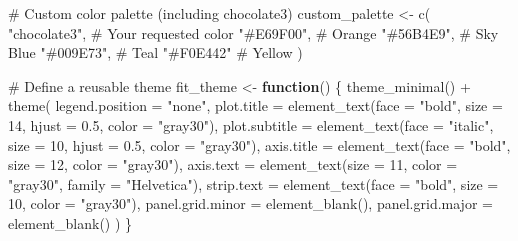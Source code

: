 \documentclass[
  letterpaper,
  oneside,
  11pt]{article}
\newenvironment{Shaded}{\begin{snugshade}}{\end{snugshade}}
\newcommand{\AttributeTok}[1]{\textcolor[rgb]{0.40,0.45,0.13}{#1}}
\newcommand{\CommentTok}[1]{\textcolor[rgb]{0.37,0.37,0.37}{#1}}
\newcommand{\ControlFlowTok}[1]{\textcolor[rgb]{0.00,0.23,0.31}{\textbf{#1}}}
\newcommand{\DecValTok}[1]{\textcolor[rgb]{0.68,0.00,0.00}{#1}}
\newcommand{\FloatTok}[1]{\textcolor[rgb]{0.68,0.00,0.00}{#1}}
\newcommand{\FunctionTok}[1]{\textcolor[rgb]{0.28,0.35,0.67}{#1}}
\newcommand{\NormalTok}[1]{\textcolor[rgb]{0.00,0.23,0.31}{#1}}
\newcommand{\OtherTok}[1]{\textcolor[rgb]{0.00,0.23,0.31}{#1}}
\newcommand{\SpecialCharTok}[1]{\textcolor[rgb]{0.37,0.37,0.37}{#1}}
\newcommand{\StringTok}[1]{\textcolor[rgb]{0.13,0.47,0.30}{#1}}
\newcounter{none} %
\begin{document}
\begin{Shaded}
\begin{Highlighting}[]
\CommentTok{\# Custom color palette (including chocolate3)}
\NormalTok{custom\_palette }\OtherTok{\textless{}{-}} \FunctionTok{c}\NormalTok{(}
  \StringTok{"chocolate3"}\NormalTok{,    }\CommentTok{\# Your requested color}
  \StringTok{"\#E69F00"}\NormalTok{,       }\CommentTok{\# Orange}
  \StringTok{"\#56B4E9"}\NormalTok{,       }\CommentTok{\# Sky Blue}
  \StringTok{"\#009E73"}\NormalTok{,       }\CommentTok{\# Teal}
  \StringTok{"\#F0E442"}        \CommentTok{\# Yellow}
\NormalTok{)}

\CommentTok{\# Define a reusable theme}
\NormalTok{fit\_theme }\OtherTok{\textless{}{-}} \ControlFlowTok{function}\NormalTok{() \{}
  \FunctionTok{theme\_minimal}\NormalTok{() }\SpecialCharTok{+}
    \FunctionTok{theme}\NormalTok{(}
      \AttributeTok{legend.position =} \StringTok{"none"}\NormalTok{,}
      \AttributeTok{plot.title =} \FunctionTok{element\_text}\NormalTok{(}\AttributeTok{face =} \StringTok{"bold"}\NormalTok{, }\AttributeTok{size =} \DecValTok{14}\NormalTok{, }\AttributeTok{hjust =} \FloatTok{0.5}\NormalTok{, }\AttributeTok{color =} \StringTok{"gray30"}\NormalTok{),}
      \AttributeTok{plot.subtitle =} \FunctionTok{element\_text}\NormalTok{(}\AttributeTok{face =} \StringTok{"italic"}\NormalTok{, }\AttributeTok{size =} \DecValTok{10}\NormalTok{, }\AttributeTok{hjust =} \FloatTok{0.5}\NormalTok{, }\AttributeTok{color =} \StringTok{"gray30"}\NormalTok{),}
      \AttributeTok{axis.title =} \FunctionTok{element\_text}\NormalTok{(}\AttributeTok{face =} \StringTok{"bold"}\NormalTok{, }\AttributeTok{size =} \DecValTok{12}\NormalTok{, }\AttributeTok{color =} \StringTok{"gray30"}\NormalTok{),}
      \AttributeTok{axis.text =} \FunctionTok{element\_text}\NormalTok{(}\AttributeTok{size =} \DecValTok{11}\NormalTok{, }\AttributeTok{color =} \StringTok{"gray30"}\NormalTok{, }\AttributeTok{family =} \StringTok{"Helvetica"}\NormalTok{),}
      \AttributeTok{strip.text =} \FunctionTok{element\_text}\NormalTok{(}\AttributeTok{face =} \StringTok{"bold"}\NormalTok{, }\AttributeTok{size =} \DecValTok{10}\NormalTok{, }\AttributeTok{color =} \StringTok{"gray30"}\NormalTok{),}
      \AttributeTok{panel.grid.minor =} \FunctionTok{element\_blank}\NormalTok{(),}
      \AttributeTok{panel.grid.major =} \FunctionTok{element\_blank}\NormalTok{()}
\NormalTok{    )}
\NormalTok{\}}
\end{Highlighting}
\end{Shaded}
\end{document}
